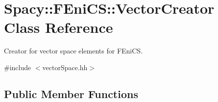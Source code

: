 \hypertarget{classSpacy_1_1FEniCS_1_1VectorCreator}{\section{\-Spacy\-:\-:\-F\-Eni\-C\-S\-:\-:\-Vector\-Creator \-Class \-Reference}
\label{classSpacy_1_1FEniCS_1_1VectorCreator}
}


\-Creator for vector space elements for \-F\-Eni\-C\-S.  




{\ttfamily \#include $<$vector\-Space.\-hh$>$}

\subsection*{\-Public \-Member \-Functions}
